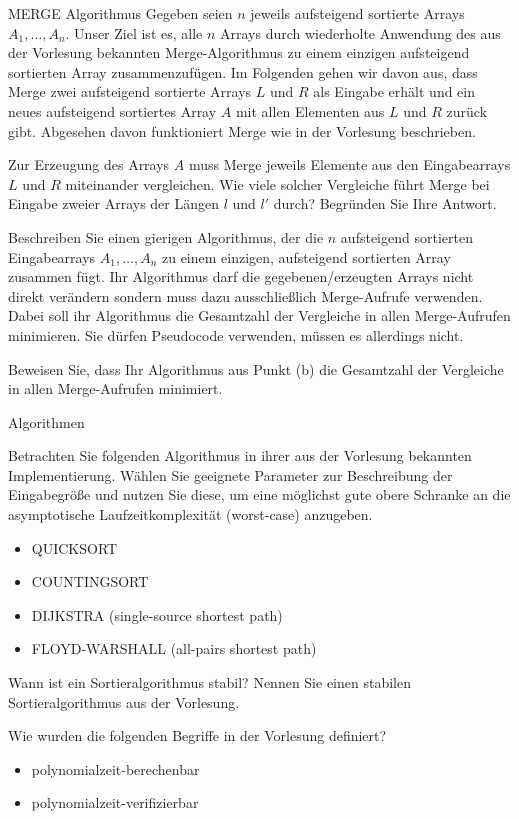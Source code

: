 \documentclass{exercisesheet}
\begin{document}
\begin{eexercises}{MERGE Algorithmus}{
    Gegeben seien $n$ jeweils aufsteigend sortierte Arrays $A_1, \ldots, A_n$. Unser Ziel ist es, alle $n$ Arrays durch wiederholte Anwendung des aus der Vorlesung bekannten Merge-Algorithmus zu einem einzigen aufsteigend sortierten Array zusammenzufügen. Im Folgenden gehen wir davon aus, dass Merge zwei aufsteigend sortierte Arrays $L$ und $R$ als Eingabe erhält und ein neues aufsteigend sortiertes Array $A$ mit allen Elementen aus $L$ und $R$ zurück gibt. Abgesehen davon funktioniert Merge wie in der Vorlesung beschrieben.
  }
  \item Zur Erzeugung des Arrays $A$ muss Merge jeweils Elemente aus den Eingabearrays $L$ und $R$ miteinander vergleichen. Wie viele solcher Vergleiche führt Merge bei Eingabe zweier Arrays der Längen $l$ und $l'$ durch? Begründen Sie Ihre Antwort.
  \item Beschreiben Sie einen gierigen Algorithmus, der die $n$ aufsteigend sortierten Eingabearrays $A_1, \ldots, A_n$ zu einem einzigen, aufsteigend sortierten Array zusammen fügt. Ihr Algorithmus darf die gegebenen/erzeugten Arrays nicht direkt verändern sondern muss dazu ausschließlich Merge-Aufrufe verwenden. Dabei soll ihr Algorithmus die Gesamtzahl der Vergleiche in allen Merge-Aufrufen minimieren. Sie dürfen Pseudocode verwenden, müssen es allerdings nicht.
  \item Beweisen Sie, dass Ihr Algorithmus aus Punkt (b) die Gesamtzahl der Vergleiche in allen Merge-Aufrufen minimiert.
\end{eexercises}



\begin{exercises}{Algorithmen}
\item Betrachten Sie folgenden Algorithmus in ihrer aus der Vorlesung bekannten Implementierung. Wählen Sie geeignete Parameter zur Beschreibung der Eingabegröße und nutzen Sie diese, um eine möglichst gute obere Schranke an die asymptotische Laufzeitkomplexität (worst-case) anzugeben.
\begin{itemize}
  \item QUICKSORT
  \item COUNTINGSORT
  \item DIJKSTRA (single-source shortest path)
  \item FLOYD-WARSHALL (all-pairs shortest path)
\end{itemize}
\item Wann ist ein Sortieralgorithmus stabil? Nennen Sie einen stabilen Sortieralgorithmus aus der Vorlesung.
\item Wie wurden die folgenden Begriffe in der Vorlesung definiert?
\begin{itemize}
  \item polynomialzeit-berechenbar
  \item polynomialzeit-verifizierbar
\end{itemize}
\end{exercises}
\end{document}
